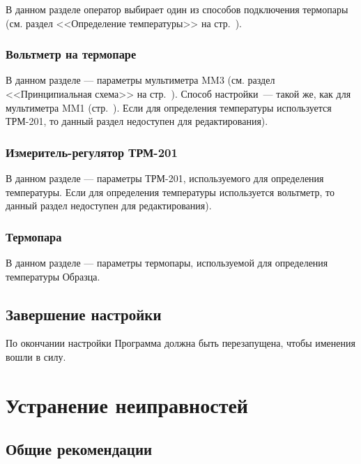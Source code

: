 \documentclass[12pt, a4paper, twocolumn]{report}
\begin{document}
В данном разделе оператор выбирает один из способов подключения термопары (см. раздел <<Определение температуры>> на стр.~\pageref{sec_t_measures}).

\subsection{Вольтметр на термопаре}

В данном разделе --- параметры мультиметра MM3 (см. раздел <<Принципиальная схема>> на стр.~\pageref{sec_schematic_diagram}). Способ настройки~--- такой же, как для мультиметра MM1 (стр.~\pageref{sec_mm1_config}). Если для определения температуры используется ТРМ-201, то данный раздел недоступен для редактирования).

\subsection{Измеритель-регулятор ТРМ-201}

В данном разделе --- параметры ТРМ-201, используемого для определения температуры. Если для определения температуры используется вольтметр, то данный раздел недоступен для редактирования).



\subsection{Термопара}

В данном разделе --- параметры термопары, используемой для определения температуры Образца.



\section{Завершение настройки}

По окончании настройки Программа должна быть перезапущена, чтобы именения вошли в силу.

\chapter{Устранение неиправностей}

\section{Общие рекомендации}
\end{document}
